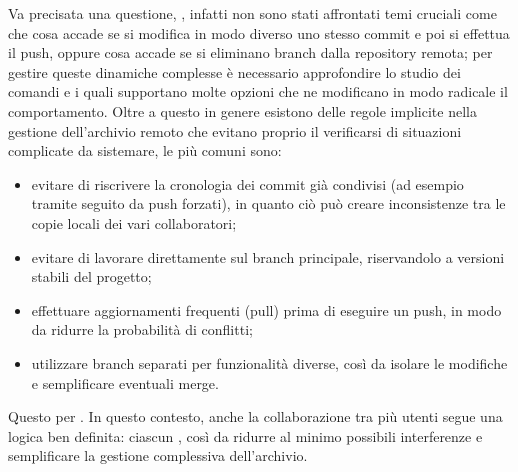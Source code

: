 Va precisata una questione, , infatti non sono stati affrontati temi cruciali come che cosa accade se si modifica in modo diverso uno stesso commit e poi si effettua il push, oppure cosa accade se si eliminano branch dalla repository remota; per gestire queste dinamiche complesse è necessario approfondire lo studio dei comandi  e  i quali supportano molte opzioni che ne modificano in modo radicale il comportamento. Oltre a questo in genere esistono delle regole implicite nella gestione dell'archivio remoto che evitano proprio il verificarsi di situazioni complicate da sistemare, le più comuni sono:
\begin{itemize}
	\item evitare di riscrivere la cronologia dei commit già condivisi (ad esempio tramite  seguito da push forzati), in quanto ciò può creare inconsistenze tra le copie locali dei vari collaboratori;
	\item evitare di lavorare direttamente sul branch principale, riservandolo a versioni stabili del progetto;
	\item effettuare aggiornamenti frequenti (pull) prima di eseguire un push, in modo da ridurre la probabilità di conflitti;
	\item utilizzare branch separati per funzionalità diverse, così da isolare le modifiche e semplificare eventuali merge.
\end{itemize}
Questo per . In questo contesto, anche la collaborazione tra più utenti segue una logica ben definita: ciascun , così da ridurre al minimo possibili interferenze e semplificare la gestione complessiva dell'archivio.

